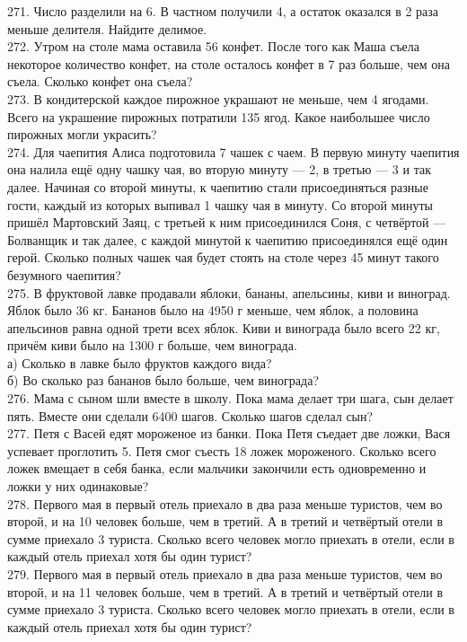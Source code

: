 271. Число разделили на 6. В частном получили 4, а остаток оказался в 2 раза меньше делителя. Найдите делимое.\\
272. Утром на столе мама оставила 56 конфет. После того как Маша съела некоторое количество конфет, на столе осталось конфет в 7 раз больше, чем она съела. Сколько конфет она съела?\\
273. В кондитерской каждое пирожное украшают не меньше, чем 4 ягодами. Всего на украшение пирожных потратили 135 ягод. Какое наибольшее число пирожных могли украсить?\\
274. Для чаепития Алиса подготовила 7 чашек с чаем. В первую минуту чаепития она налила ещё одну чашку чая, во вторую минуту --- 2, в третью --- 3 и так далее. Начиная со второй минуты, к чаепитию стали присоединяться разные гости, каждый из которых выпивал 1 чашку чая в минуту. Со второй минуты пришёл Мартовский Заяц, с третьей к ним присоединился Соня, с четвёртой  --- Болванщик и так далее, с каждой минутой к чаепитию присоединялся ещё один герой. Сколько полных чашек чая будет стоять на столе через 45 минут такого безумного чаепития?\\
275. В фруктовой лавке продавали яблоки, бананы, апельсины, киви и виноград. Яблок было 36 кг. Бананов было на 4950 г меньше, чем яблок, а половина апельсинов равна одной трети всех яблок. Киви и винограда было всего 22 кг, причём киви было на 1300 г больше, чем винограда.\\
а) Сколько в лавке было фруктов каждого вида?\\
б) Во сколько раз бананов было больше, чем винограда?\\
276. Мама с сыном шли вместе в школу. Пока мама делает три шага, сын делает пять. Вместе они сделали 6400 шагов. Сколько шагов сделал сын?\\
277. Петя с Васей едят мороженое из банки. Пока Петя съедает две ложки, Вася успевает проглотить 5. Петя смог съесть 18 ложек мороженого. Сколько всего ложек вмещает в себя банка, если мальчики закончили есть одновременно и ложки у них одинаковые?\\
278. Первого мая в первый отель приехало в два раза меньше туристов, чем во второй, и на 10 человек больше, чем в третий. А в третий и четвёртый отели в сумме приехало 3 туриста. Сколько всего человек могло приехать в отели, если в каждый отель приехал хотя бы один турист?\\
279. Первого мая в первый отель приехало в два раза меньше туристов, чем во второй, и на 11 человек больше, чем в третий. А в третий и четвёртый отели в сумме приехало 3 туриста. Сколько всего человек могло приехать в отели, если в каждый отель приехал хотя бы один турист?\\

